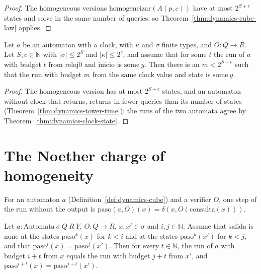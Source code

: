 \begin{proof}
  \leanok
  The homogeneous versions $\mathrm{homogeneizar}(A(p,c))$ have at most $2^{S+c}$ states and solve
  in the same number of queries, so Theorem~\ref{thm:dynamics-cube-law} applies.
\end{proof}

\begin{theorem}
  \label{thm:dynamics-clock-memory}
  \leanok
  Let $a$ be an automaton with a clock, with $\kappa$ and $\sigma$ finite types, and
  $O : Q \to R$. Let $S, c \in \mathbb{N}$ with $|\sigma| \le 2^S$ and $|\kappa| \le 2^c$, and
  assume that for some $t$ the run of $a$ with budget $t$ from $\mathrm{reloj0}$ and
  $\mathrm{inicio}$ is $\mathrm{some}\ y$. Then there is an $m < 2^{S+c}$ such that the run with
  budget $m$ from the same clock value and state is $\mathrm{some}\ y$.
  \own{}
\end{theorem}

\begin{proof}
  \leanok
  The homogeneous version has at most $2^{S+c}$ states, and an automaton without clock that
  returns, returns in fewer queries than its number of states (Theorem~\ref{thm:dynamics-tower-time});
  the runs of the two automata agree by Theorem~\ref{thm:dynamics-clock-state}.
\end{proof}

\section{The Noether charge of homogeneity}
\label{sec:dynamics-charge}

For an automaton $a$ (Definition~\ref{def:dynamics-cube}) and a verifier $O$, one step of the run
without the output is $\mathrm{paso}(a, O)(x) = \delta(x, O(\mathrm{consulta}(x)))$.

\begin{theorem}
  \label{thm:dynamics-noether-charge}
  \leanok
  Let $a : \mathrm{Automata}\ \sigma\ Q\ R\ Y$, $O : Q \to R$, $x, x' \in \sigma$ and
  $i, j \in \mathbb{N}$. Assume that $\mathrm{salida}$ is $\mathrm{none}$ at the states
  $\mathrm{paso}^{k}(x)$ for $k < i$ and at the states $\mathrm{paso}^{k}(x')$ for $k < j$, and that
  $\mathrm{paso}^{i}(x) = \mathrm{paso}^{j}(x')$. Then for every $t \in \mathbb{N}$, the run of
  $a$ with budget $i + t$ from $x$ equals the run with budget $j + t$ from $x'$, and
  $\mathrm{paso}^{i+t}(x) = \mathrm{paso}^{j+t}(x')$.
  \own{}
\end{theorem}

